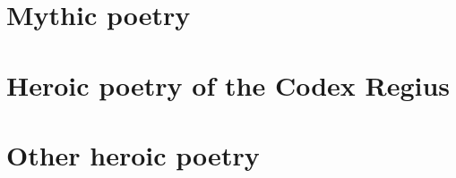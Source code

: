
\frontmatter%

%

\mainmatter%

\part{Mythic poetry}%

\part{Heroic poetry of the Codex Regius}%
	



\part{Other heroic poetry}



